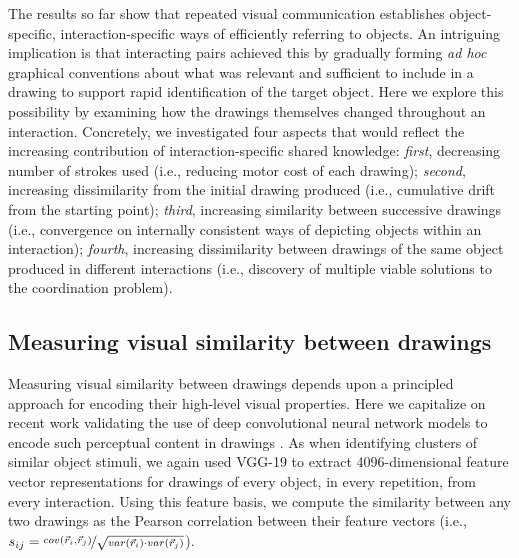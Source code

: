 The results so far show that repeated visual communication establishes object-specific, interaction-specific ways of efficiently referring to objects.
An intriguing implication is that interacting pairs achieved this by gradually forming \textit{ad hoc} graphical conventions about what was relevant and sufficient to include in a drawing to support rapid identification of the target object.
Here we explore this possibility by examining how the drawings themselves changed throughout an interaction.
Concretely, we investigated four aspects that would reflect the increasing contribution of interaction-specific shared knowledge:
\textit{first}, decreasing number of strokes used (i.e., reducing motor cost of each drawing);
\textit{second}, increasing dissimilarity from the initial drawing produced (i.e., cumulative drift from the starting point);
\textit{third}, increasing similarity between successive drawings (i.e., convergence on internally consistent ways of depicting objects within an interaction);
\textit{fourth}, increasing dissimilarity between drawings of the same object produced in different interactions (i.e., discovery of multiple viable solutions to the coordination problem).




\subsection{Measuring visual similarity between drawings}

Measuring visual similarity between drawings depends upon a principled approach for encoding their high-level visual properties.
Here we capitalize on recent work validating the use of deep convolutional neural network models to encode such perceptual content in drawings \cite{FanCommon2018}.
As when identifying clusters of similar object stimuli, we again used VGG-19 to extract 4096-dimensional feature vector representations for drawings of every object, in every repetition, from every interaction.
Using this feature basis, we compute the similarity between any two drawings as the Pearson correlation between their feature vectors (i.e., $s_{ij} =  \nicefrac{cov(\vec{r}_{i}, \vec{r}_{j})}{\sqrt{var(\vec{r}_{i}) \cdot var(\vec{r}_{j})}}$).

